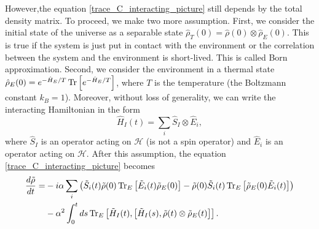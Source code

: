 However,the equation \eqref{trace_C_interacting_picture} still depends by the total density matrix. To proceed, we make two more assumption. First, we consider the initial state of the universe as a separable state $\hat\rho_T(0)=\hat\rho(0)\otimes \hat\rho_E(0)$. This is true if the system is just put in contact with the environment or the correlation between the system and the environment is short-lived. This is called Born approximation. 
Second, we consider the environment in a thermal state $\hat\rho_E(0) = e^{-\hat H_E/T}\operatorname{Tr}\left[e^{-\hat H_E/T}\right]$, where $T$ is the temperature (the Boltzmann constant $k_B = 1$).
Moreover, without loss of generality, we can write the interacting Hamiltonian in the form
\begin{equation}
    \hat H_I(t) = \sum_i \hat S_I\otimes \hat E_i,
\end{equation}
where $\hat S_I$ is an operator acting on $\mathcal{H}$ (is not a spin operator) and $\hat E_i$ is an operator acting on $\mathcal{H}$. After this assumption, the equation \eqref{trace_C_interacting_picture} becomes
\begin{equation}
    \begin{split}
        \frac{d\tilde\rho}{dt} =&-i\alpha\sum_i\left(\tilde S_i(t)\tilde \rho(0)\operatorname{Tr}_E\left[\tilde E_i(t)\tilde\rho_E(0)\right] - \tilde \rho(0)\tilde S_i(t)\operatorname{Tr}_E\left[\tilde\rho_E(0)\tilde E_i(t)\right]\right) \\ 
        &-\alpha^2 \int_{0}^{t}ds \operatorname{Tr}_E\left[\tilde H_I(t),\left[\tilde H_I(s),\tilde\rho(t)\otimes\tilde\rho_E(t)\right]\right].
    \end{split}
\end{equation}

